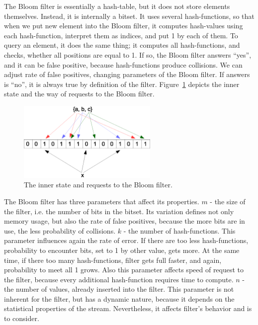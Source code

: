The Bloom filter is essentially a hash-table, but it does not store elements themselves.
Instead, it is internally a bitset.
It uses several hash-functions, so that when we put new element into the Bloom filter, it computes hash-values using each hash-function, interpret them as indices, and put 1 by each of them.
To query an element, it does the same thing; it computes all hash-functions, and checks, whether all positions are equal to 1.
If so, the Bloom filter answers ``yes'', and it can be false positive, because hash-functions produce collisions.
We can adjust rate of false positives, changing parameters of the Bloom filter.
If answers is ``no'', it is always true by definition of the filter.
Figure~\ref{fig:bloom_filter} depicts the inner state and the way of requests to the Bloom filter.

\begin{figure}[h]
  \centering
  \includegraphics [width=0.6\textwidth]{images/BloomFilter}
  \caption{The inner state and requests to the Bloom filter.}
  \label{fig:bloom_filter}
\end{figure}

The Bloom filter has three parameters that affect its properties.
$m$ - the size of the filter, i.e. the number of bits in the bitset.
Its variation defines not only memory usage, but also the rate of false positives, because the more bits are in use, the less probability of collisions.
$k$ - the number of hash-functions.
This parameter influences again the rate of error.
If there are too less hash-functions, probability to encounter bits, set to 1 by other value, gets more.
At the same time, if there too many hash-functions, filter gets full faster, and again, probability to meet all 1 grows.
Also this parameter affects speed of request to the filter, because every additional hash-function requires time to compute.
$n$ - the number of values, already inserted into the filter.
This parameter is not inherent for the filter, but has a dynamic nature, because it depends on the statistical properties of the stream.
Nevertheless, it affects filter's behavior and is to consider.

